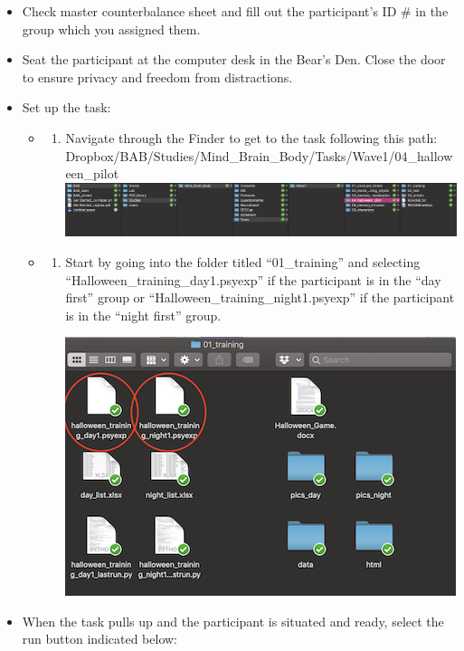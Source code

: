 \documentclass[]{book}
\providecommand{\tightlist}{%
  \setlength{\itemsep}{0pt}\setlength{\parskip}{0pt}}
\begin{document}
\begin{itemize}
\item
  Check master counterbalance sheet and fill out the participant's ID \# in the group which you assigned them.
\item
  Seat the participant at the computer desk in the Bear's Den. Close the door to ensure privacy and freedom from distractions.
\item
  Set up the task:

  \begin{itemize}
  \item
    \begin{enumerate}
    \def\labelenumi{\alph{enumi}.}
    \tightlist
    \item
      Navigate through the Finder to get to the task following this path:
      Dropbox/BAB/Studies/Mind\_Brain\_Body/Tasks/Wave1/04\_halloween\_pilot
      \includegraphics{images/halloween/1.png}
    \end{enumerate}
  \item
    \begin{enumerate}
    \def\labelenumi{\alph{enumi}.}
    \setcounter{enumi}{1}
    \item
      Start by going into the folder titled ``01\_training'' and selecting ``Halloween\_training\_day1.psyexp'' if the participant is in the ``day first'' group or ``Halloween\_training\_night1.psyexp'' if the participant is in the ``night first'' group.

      \includegraphics{images/halloween/2.png}
    \end{enumerate}
  \end{itemize}
\item
  When the task pulls up and the participant is situated and ready, select the run button indicated below:


\end{itemize}
\end{document}
